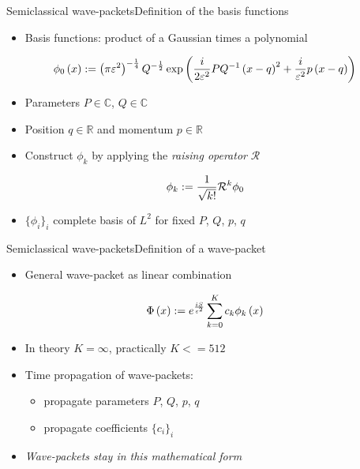 \documentclass{beamer}
\begin{document}
\begin{frame}{Semiclassical wave-packets}{Definition of the basis functions}
  \begin{itemize}
    \item Basis functions: product of a Gaussian times a polynomial
  \end{itemize}
  \begin{equation*} \label{eq:hagedorn_groundstate_1d}
  \phi_0 \left( x \right) :=
  \left(\pi\varepsilon^2\right)^{-\frac{1}{4}} Q^{-\frac{1}{2}}
  \exp \left(
      \frac{i}{2\varepsilon^2} PQ^{-1}\left(x-q\right)^2
      + \frac{i}{\varepsilon^2} p\left(x-q\right)
  \right)
  \end{equation*}
  \begin{itemize}
    \item Parameters $P \in \mathbb{C}$, $Q \in \mathbb{C}$
    \item Position $q \in \mathbb{R}$ and momentum $p \in \mathbb{R}$
    \item Construct $\phi_k$ by applying the \emph{raising operator} $\mathcal{R}$
  \end{itemize}
  \begin{equation*}
    \phi_k := \frac{1}{\sqrt{k!}} \mathcal{R}^k \phi_0
  \end{equation*}
  \begin{itemize}
    \item $\{\phi_i\}_i$ complete basis of $L^2$ for fixed $P$, $Q$, $p$, $q$
  \end{itemize}
\end{frame}


\begin{frame}{Semiclassical wave-packets}{Definition of a wave-packet}
  \begin{itemize}
    \item General wave-packet as linear combination
  \end{itemize}
  \begin{equation*} \label{eq:hawp_def_single}
    \Phi\left( x \right) := e^{\frac{iS}{\varepsilon^2}} \sum_{k=0}^{K} c_k \phi_k \left( x \right)
  \end{equation*}
  \begin{itemize}
    \item In theory $K = \infty$, practically $K <= 512$
    \item Time propagation of wave-packets:
    \begin{itemize}
      \item propagate parameters $P$, $Q$, $p$, $q$
      \item propagate coefficients $\{c_i\}_i$
    \end{itemize}
    \item \emph{Wave-packets stay in this mathematical form}
  \end{itemize}
\end{frame}
\end{document}
